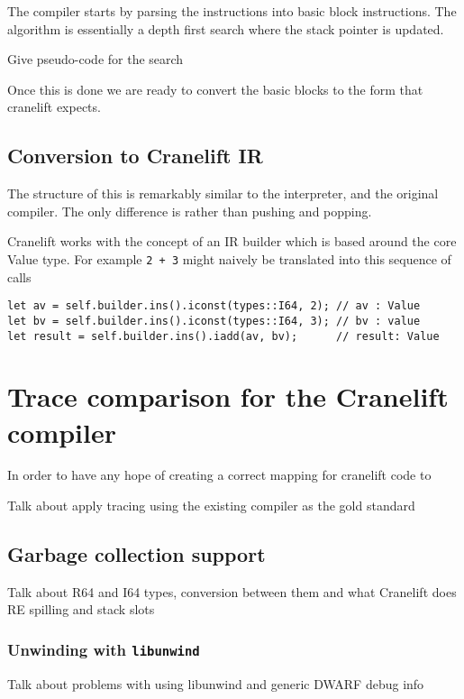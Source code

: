 The compiler starts by parsing the instructions into basic block instructions. The algorithm is
essentially a depth first search where the stack pointer is updated.

Give pseudo-code for the search

Once this is done we are ready to convert the basic blocks to the form that cranelift expects.

\subsection{Conversion to Cranelift IR}

The structure of this is remarkably similar to the interpreter, and the original compiler. The only
difference is rather than pushing and popping.

Cranelift works with the concept of an IR builder which is based around the core Value type. For
example \texttt{2 + 3} might naively be translated into this sequence of calls

\begin{verbatim}
let av = self.builder.ins().iconst(types::I64, 2); // av : Value
let bv = self.builder.ins().iconst(types::I64, 3); // bv : value
let result = self.builder.ins().iadd(av, bv);      // result: Value
\end{verbatim}

\section{Trace comparison for the Cranelift compiler}

In order to have any hope of creating a correct mapping for cranelift code to

Talk about apply tracing using the existing compiler as the gold standard

\subsection{Garbage collection support}

Talk about R64 and I64 types, conversion between them and what Cranelift does RE spilling and stack
slots

\subsubsection{Unwinding with \texttt{libunwind}}

Talk about problems with using libunwind and generic DWARF debug info


